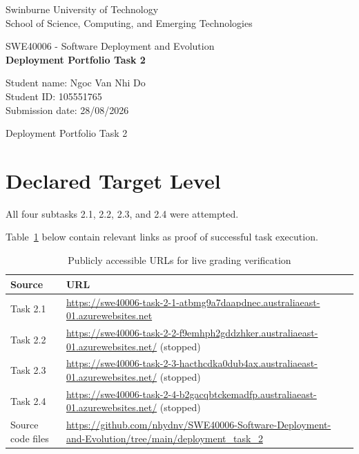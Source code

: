 \documentclass{article}
\begin{document}
\begin{titlepage}
\begin{center}
\vspace*{1cm}

Swinburne University of Technology \\
School of Science, Computing, and Emerging Technologies
\vspace{8cm}

SWE40006 - Software Deployment and Evolution \\
\textbf{Deployment Portfolio Task 2}
\vfill

Student name: Ngoc Van Nhi Do \\
Student ID: 105551765 \\
Submission date: 28/08/2026
\end{center}
\end{titlepage}

\pagestyle{fancy}
\fancyfoot{}
\renewcommand{\footrulewidth}{0.4pt}%
\fancyfoot[R]{\small\thepage}

\newpage

\begin{center}
\vspace*{2px}
{\LARGE
\setlength{\baselineskip}{2em}
Deployment Portfolio Task 2
}
\end{center}

\section{Declared Target Level}

All four subtasks 2.1, 2.2, 2.3, and 2.4 were attempted.

Table~\ref{tab:links} below contain relevant links as proof of successful task execution.

\begin{table}[ht]
\centering
\caption{Publicly accessible URLs for live grading verification} 
\label{tab:links}
\vspace{2pt}
\def\arraystretch{1.5}
\begin{tabular}{|p{2cm}|p{14cm}|}
\hline
\textbf{Source} & \textbf{URL} \\
\hline
Task 2.1 & \url{https://swe40006-task-2-1-atbmg9a7daapdnec.australiaeast-01.azurewebsites.net} \\
\hline
Task 2.2 & \url{https://swe40006-task-2-2-f9emhph2gddzhker.australiaeast-01.azurewebsites.net/} (stopped) \\
\hline
Task 2.3 & \url{https://swe40006-task-2-3-hacthcdka0dub4ax.australiaeast-01.azurewebsites.net/} (stopped) \\
\hline
Task 2.4 & \url{https://swe40006-task-2-4-b2gacqbtckemadfp.australiaeast-01.azurewebsites.net/} (stopped) \\
\hline
Source code files & \url{https://github.com/nhydnv/SWE40006-Software-Deployment-and-Evolution/tree/main/deployment_task_2} \\
\hline
\end{tabular}
\end{table}
\end{document}
